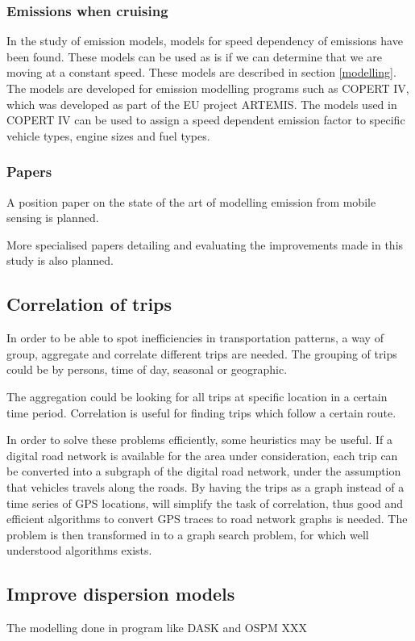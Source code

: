 \subsubsection{Emissions when cruising}
In the study of emission models, models for speed dependency of emissions have been found. These models can be used as is if we can determine that we are moving at a constant speed. These models are described in section \ref{modelling}. The models are developed for emission modelling programs such as COPERT IV, which was developed as part of the EU project ARTEMIS. The models used in COPERT IV can be used to assign a speed dependent emission factor to specific vehicle types, engine sizes and fuel types.
 
\subsubsection{Papers}
A position paper on the state of the art of modelling emission from mobile sensing is planned.

More specialised papers detailing and evaluating the improvements made in this study is also planned.

\subsection{Correlation of trips}
In order to be able to spot inefficiencies in transportation patterns, a way of group, aggregate and correlate different trips are needed. The grouping of trips could be by persons, time of day, seasonal or geographic. 

The aggregation could be looking for all trips at specific location in a certain time period. Correlation is useful for finding trips which follow a certain route.

In order to solve these problems efficiently, some heuristics may be useful. If a digital road network is available for the area under consideration, each trip can be converted into a subgraph of the  digital road network, under the assumption that vehicles travels along the roads. By having the trips as a graph instead of a time series of GPS locations, will simplify the task of correlation, thus good and efficient algorithms to convert GPS traces to road network graphs is needed. The problem is then transformed in to a graph search problem, for which well understood algorithms exists.

\subsection{Improve dispersion models}
The modelling done in program like DASK and OSPM  XXX

